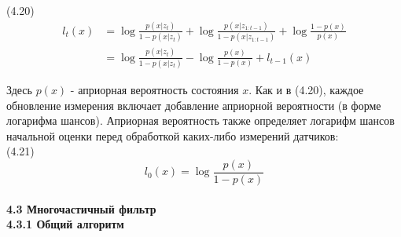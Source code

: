 \documentclass[10pt,a4paper]{article}
\begin{document}
(4.20)
\begin{equation*}
\begin{split}
l_t(x)&=\log\frac{p(x|z_t)}{1-p(x|z_t)}+\log\frac{p(x|z_{1:t-1})}{1-p(x|z_{1:t-1})}+\log\frac{1-p(x)}{p(x)}\\
&=\log\frac{p(x|z_t)}{1-p(x|z_t)}-\log\frac{p(x)}{1-p(x)}+l_{t-1}(x)
\end{split}
\end{equation*}

Здесь $p(x)$ - априорная вероятность состояния $x$. Как и в (4.20), каждое обновление измерения включает добавление априорной вероятности (в форме логарифма шансов). Априорная вероятность также определяет логарифм шансов начальной оценки перед обработкой каких-либо измерений датчиков:\\

(4.21)
$$l_0(x)=\log\frac{p(x)}{1-p(x)}$$\\

\textbf{4.3 Многочастичный фильтр}\\

\textbf{4.3.1 Общий алгоритм}\\
\end{document}
